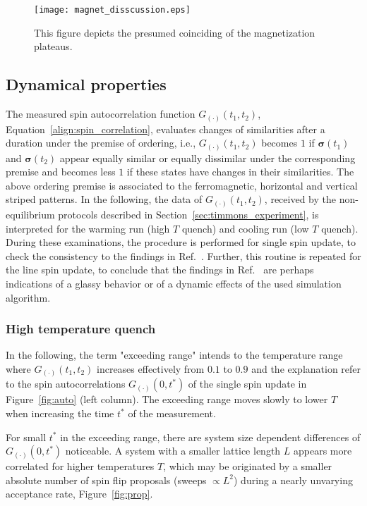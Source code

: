 \begin{figure}[!h]
  \texttt{[image: magnet\_disscussion.eps]}
  \caption{This figure depicts the presumed coinciding of the magnetization plateaus.}
  \label{fig:magnet_disscussion}
\end{figure}



\subsection*{Dynamical properties}

The measured spin autocorrelation function $G_{(\cdot)}(t_1,t_2)$, Equation~\eqref{align:spin_correlation}, evaluates changes of 
similarities after a duration under the premise of ordering, i.e., $G_{(\cdot)}(t_1,t_2)$ becomes $1$ if 
$\bm{\sigma}(t_1)$ and $\bm{\sigma}(t_2)$ appear equally similar or equally dissimilar under the corresponding premise 
and becomes less $1$ if these states have changes in their similarities. The above ordering premise is associated to the ferromagnetic, 
horizontal and vertical striped patterns. In the following, the data of $G_{(\cdot)}(t_1,t_2)$, received by the non-equilibrium protocols described in 
Section~\ref{sec:timmons_experiment}, is interpreted for the warming run (high $T$ quench) and cooling run (low $T$ quench). During these
examinations, the procedure is performed for single spin update, to check the consistency to the findings in Ref.~\cite{Timmons2018}. Further, this routine is 
repeated for the line spin update, to conclude that the findings in Ref.~\cite{Timmons2018} are perhaps indications of a glassy behavior or of a 
dynamic effects of the used simulation algorithm.

\subsubsection*{High temperature quench}

In the following, the term "exceeding range" intends to the temperature range where $G_{(\cdot)}(t_1,t_2)$ 
increases effectively from $0.1$ to $0.9$ and the explanation refer to the spin autocorrelations $G_{(\cdot)}(0,t^*)$ of the single spin update in 
Figure~\ref{fig:auto} (left column). The exceeding range moves slowly to lower $T$ when increasing the time $t^*$ of the measurement.

For small 
$t^*$ in the exceeding range, there are system size dependent differences of $G_{(\cdot)}(0,t^*)$ noticeable. A system with a smaller lattice 
length $L$ appears more correlated for higher temperatures $T$, which may be originated by a smaller absolute number of spin flip proposals 
(sweeps $\propto L^2$) during a nearly unvarying acceptance rate, Figure~\ref{fig:prop}.

